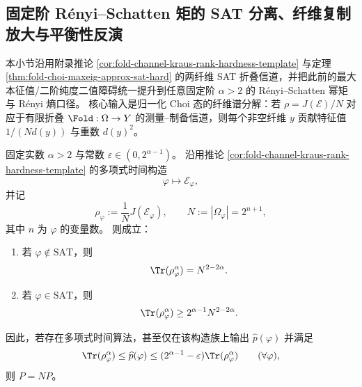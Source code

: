 \subsection{固定阶 Rényi--Schatten 矩的 SAT 分离、纤维复制放大与平衡性反演}\label{subsec:conclusion-renyi-schatten-choi-sat-gap-copy-amplification}
本小节沿用附录推论 \ref{cor:fold-channel-kraus-rank-hardness-template} 与定理 \ref{thm:fold-choi-maxeig-approx-sat-hard} 的两纤维 SAT 折叠信道，并把此前的最大本征值/二阶纯度二值障碍统一提升到任意固定阶 \(\alpha>2\) 的 Rényi--Schatten 幂矩与 Rényi 熵口径。
核心输入是归一化 Choi 态的纤维谱分解：若 \(\rho=J(\mathcal E)/N\) 对应于有限折叠 \(\Fold:\Omega\to Y\) 的测量--制备信道，则每个非空纤维 \(y\) 贡献特征值 \(1/(N d(y))\) 与重数 \(d(y)^2\)。

\begin{theorem}\label{thm:conclusion-fixed-alpha-renyi-schatten-sat-gap}
固定实数 \(\alpha>2\) 与常数 \(\varepsilon\in(0,2^{\alpha-1})\)。
沿用推论 \ref{cor:fold-channel-kraus-rank-hardness-template} 的多项式时间构造
\[
\varphi\longmapsto \mathcal E_\varphi,
\]
并记
\[
\rho_\varphi:=\frac{1}{N}J(\mathcal E_\varphi),
\qquad
N:=|\Omega_\varphi|=2^{n+1},
\]
其中 \(n\) 为 \(\varphi\) 的变量数。
则成立：
\begin{enumerate}
\normalfont
  \item 若 \(\varphi\notin\mathrm{SAT}\)，则
  \[
  \Tr(\rho_\varphi^\alpha)=N^{2-2\alpha}.
  \]
  \item 若 \(\varphi\in\mathrm{SAT}\)，则
  \[
  \Tr(\rho_\varphi^\alpha)\ge 2^{\alpha-1}N^{2-2\alpha}.
  \]
\end{enumerate}
因此，若存在多项式时间算法，甚至仅在该构造族上输出 \(\widehat p(\varphi)\) 并满足
\[
\Tr(\rho_\varphi^\alpha)\le \widehat p(\varphi)\le (2^{\alpha-1}-\varepsilon)\Tr(\rho_\varphi^\alpha)
\qquad(\forall \varphi),
\]
则 \(P=NP\)。
\end{theorem}
